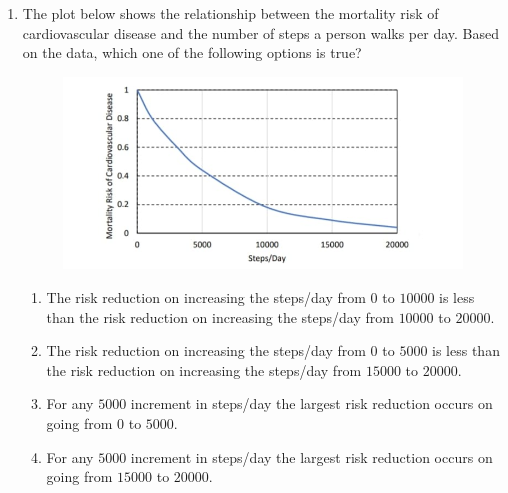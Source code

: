 \documentclass[journal,12pt,onecolumn]{article}
\theoremstyle{remark}
\begin{document}
\begin{enumerate}
    \hfill{}
    \begin{enumerate}
    \end{enumerate}

    \item The plot  below shows the relationship between the mortality risk of cardiovascular
    disease and the number of steps a person walks per day. Based on the data, which
    one of the following options is true?
    \begin{figure}[H]
        \centering
        \includegraphics[width=0.7\columnwidth]{figs/2Q8.jpg}
        \caption{}
        \label{fig:q8}
    \end{figure}
    
    \hfill{}
    \begin{enumerate}
        \item The risk reduction on increasing the steps/day from $0$ to $10000$ is less than the risk
        reduction on increasing the steps/day from $10000$ to $20000$.
        \item The risk reduction on increasing the steps/day from $0$ to $5000$ is less than the risk
        reduction on increasing the steps/day from $15000$ to $20000$.
        \item For any $5000$ increment in steps/day the largest risk reduction occurs on going from
        $0$ to $5000$.
        \item For any $5000$ increment in steps/day the largest risk reduction occurs on going from
        $15000$ to $20000$.
    \end{enumerate}


\end{enumerate}
\end{document}
